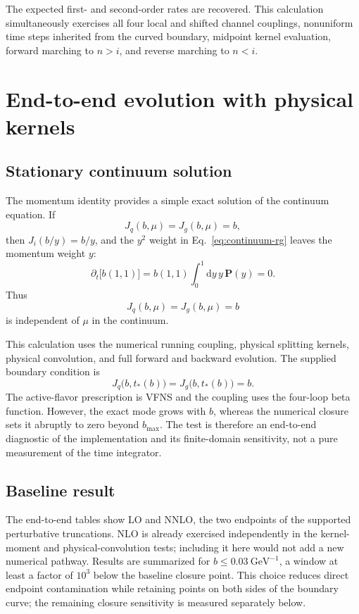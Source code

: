 \documentclass[11pt]{article}
\newcommand{\dd}{\mathrm{d}}
\newcommand{\Pmat}{\bm P}
\begin{document}
The expected first- and second-order rates are recovered. This calculation
simultaneously exercises all four local and shifted channel couplings,
nonuniform time steps inherited from the curved boundary, midpoint kernel
evaluation, forward marching to \(n>i\), and reverse marching to \(n<i\).

\section{End-to-end evolution with physical kernels}

\subsection{Stationary continuum solution}

The momentum identity provides a simple exact solution of the continuum
equation. If
\[
  J_q(b,\mu)=J_g(b,\mu)=b,
\]
then \(J_i(b/y)=b/y\), and the \(y^2\) weight in
Eq.~\eqref{eq:continuum-rg} leaves the momentum weight \(y\):
\begin{equation}
  \partial_t\bigl[b(1,1)\bigr]
  =
  b(1,1)\int_0^1\dd y\,y\,\Pmat(y)=0.
  \label{eq:stationary-from-momentum}
\end{equation}
Thus
\begin{equation}
  J_q(b,\mu)=J_g(b,\mu)=b
  \label{eq:stationary-solution}
\end{equation}
is independent of \(\mu\) in the continuum.

This calculation uses the numerical running coupling, physical splitting
kernels, physical convolution, and full forward and backward evolution. The
supplied boundary condition is
\[
  J_q\bigl(b,t_*(b)\bigr)=J_g\bigl(b,t_*(b)\bigr)=b.
\]
The active-flavor prescription is VFNS and the coupling uses the four-loop
beta function.
However, the exact mode grows with \(b\), whereas the numerical closure sets
it abruptly to zero beyond \(b_{\max}\). The test is therefore an
end-to-end diagnostic of the implementation and its finite-domain
sensitivity, not a pure measurement of the time integrator.

\subsection{Baseline result}

The end-to-end tables show LO and NNLO, the two endpoints of the supported
perturbative truncations. NLO is already exercised independently in the
kernel-moment and physical-convolution tests; including it here would not add
a new numerical pathway. Results are summarized for
\(b\le0.03~\mathrm{GeV}^{-1}\), a window at least a factor of \(10^3\) below
the baseline closure point. This choice reduces direct endpoint
contamination while retaining points on both sides of the boundary curve; the
remaining closure sensitivity is measured separately below.
\end{document}
